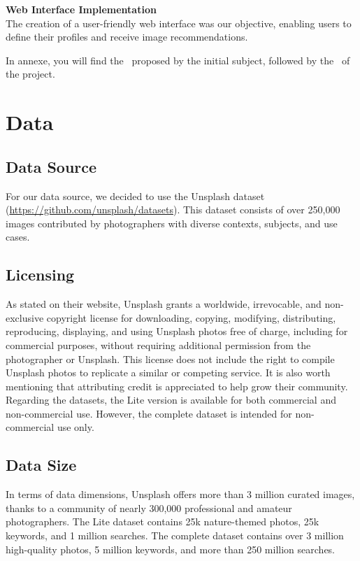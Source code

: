 \documentclass{article}
\begin{document}
    \textbf{Web Interface Implementation}\\
    The creation of a user-friendly web interface was our objective, enabling users to define their profiles and receive image recommendations.

    In annexe, you will find the~\hyperref[subsec:target_architecture]{} proposed by the initial subject, followed by the~\hyperref[subsec:actual_architecture]{} of the project.

    \newpage


    \section{Data}\label{sec:data}

    \subsection{Data Source}\label{subsec:data_source}
    For our data source, we decided to use the Unsplash dataset (\url{https://github.com/unsplash/datasets}).
    This dataset consists of over 250,000 images contributed by photographers with diverse contexts, subjects, and use cases.

    \subsection{Licensing}\label{subsec:licensing}
    As stated on their website, Unsplash grants a worldwide, irrevocable, and non-exclusive copyright license for
    downloading, copying, modifying, distributing, reproducing, displaying, and using Unsplash photos free of charge, including for commercial purposes, without requiring additional permission from the photographer or Unsplash.
    This license does not include the right to compile Unsplash photos to replicate a similar or competing service.
    It is also worth mentioning that attributing credit is appreciated to help grow their community.
    Regarding the datasets, the Lite version is available for both commercial and non-commercial use.
    However, the complete dataset is intended for non-commercial use only.

    \subsection{Data Size}\label{subsec:data_size}
    In terms of data dimensions, Unsplash offers more than 3 million curated images, thanks to a community of nearly 300,000 professional and amateur photographers.
    The Lite dataset contains 25k nature-themed photos, 25k keywords, and 1 million searches.
    The complete dataset contains over 3 million high-quality photos, 5 million keywords, and more than 250 million searches.
\end{document}
